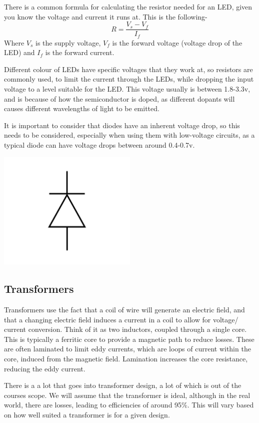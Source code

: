 \documentclass[a4paper,11pt]{report}
\newcommand{\Theory}[1] %
{
\phantomsection %
\todo[inline, color=green!30]{\textbf{#1}} %
\vspace{1em} %
}
\begin{document}
There is a common formula for calculating the resistor needed for an LED, given you know the voltage and current it runs at. This is the following-
\[R = \frac{V_s - V_f}{I_f}\]
Where $V_s$ is the supply voltage, $V_f$ is the forward voltage (voltage drop of the LED) and $I_f$ is the forward current.

Different colour of LEDs have specific voltages that they work at, so resistors are commonly used, to limit the current through the LEDs, while dropping the input voltage to a level suitable for the LED. This voltage usually is between 1.8-3.3v, and is because of how the semiconductor is doped, as different dopants will causes different wavelengths of light to be emitted.

It is important to consider that diodes have an inherent voltage drop, so this needs to be considered, especially when using them with low-voltage circuits, as a typical diode can have voltage drops between around 0.4-0.7v.

\includegraphics[width=0.5\textwidth]{diode1}

\subsection{Transformers}

\Theory{What are Transformers?}

Transformers use the fact that a coil of wire will generate an electric field, and that a changing electric field induces a current in a coil to allow for voltage/ current conversion. Think of it as two inductors, coupled through a single core. This is typically a ferritic core to provide a magnetic path to reduce losses. These are often laminated to limit eddy currents, which are loops of current within the core, induced from the magnetic field. Lamination increases the core resistance, reducing the eddy current.

There is a a lot that goes into transformer design, a lot of which is out of the courses scope. We will assume that the transformer is ideal, although in the real world, there are losses, leading to efficiencies of around 95\%. This will vary based on how well suited a transformer is for a given design.
\end{document}
